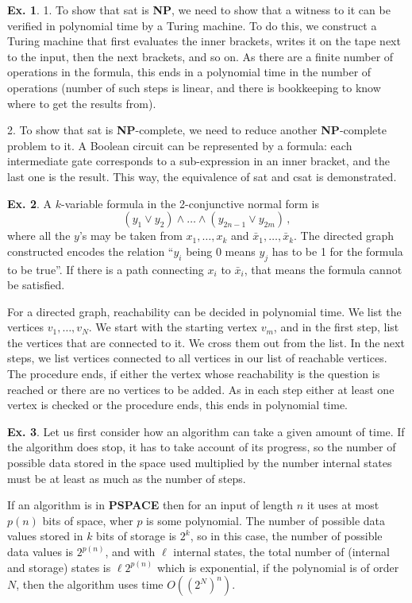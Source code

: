 \documentclass[a4paper,12pt]{article}
\theoremstyle{definition}
\newtheorem{exercise}{Ex.}[section]
\begin{document}
\begin{exercise}
 1. To show that {\sc sat} is {\bf NP}, we need to show that a witness to it can be verified in polynomial time by a Turing machine. To do this, we construct a Turing machine that first evaluates the inner brackets, writes it on the tape next to the input, then the next brackets, and so on. As there are a finite number of operations in the formula, this ends in a polynomial time in the number of operations (number of such steps is linear, and there is bookkeeping to know where to get the results from).
 
 2. To show that {\sc sat} is {\bf NP}-complete, we need to reduce another {\bf NP}-complete problem to it. A Boolean circuit can be represented by a formula: each intermediate gate corresponds to a sub-expression in an inner bracket, and the last one is the result. This way, the equivalence of {\sc sat} and {\sc csat} is demonstrated.
\end{exercise}

\begin{exercise}
 A $k$-variable formula in the 2-conjunctive normal form is
 \[
  (y_1 \lor y_2) \land \dots \land (y_{2n-1} \lor y_{2m})\,,
 \]
 where all the $y$'s may be taken from $x_1, \dots, x_k$ and $\bar{x}_1, \dots, \bar{x}_k$. The directed graph constructed encodes the relation ``$y_i$ being 0 means $y_j$ has to be 1 for the formula to be true''. If there is a path connecting $x_i$ to $\bar{x}_i$, that means the formula cannot be satisfied.
 
 For a directed graph, reachability can be decided in polynomial time. We list the vertices $v_1, \dots, v_N$. We start with the starting vertex $v_m$, and in the first step, list the vertices  that are connected to it. We cross them out from the list. In the next steps, we list vertices connected to all vertices in our list of reachable vertices. The procedure ends, if either the vertex whose reachability is the question is reached or there are no vertices to be added. As in each step either at least one vertex is checked or the procedure ends, this ends in polynomial time.
\end{exercise}

\begin{exercise}
 Let us first consider how an algorithm can take a given amount of time.  If the algorithm does stop, it has to take account of its progress, so the number of possible data stored in the space used multiplied by the number internal states must be at least as much as the number of steps.
 
 If an algorithm is in {\bf PSPACE} then for an input of length $n$ it uses at most $p(n)$ bits of space, wher $p$ is some polynomial. The number of possible data values stored in $k$ bits of storage is $2^k$, so in this case, the number of possible data values is $2^{p(n)}$, and with $\ell$ internal states, the total number of (internal and storage) states is $\ell 2^{p(n)}$ which is exponential, if the polynomial is of order $N$, then the algorithm uses time $O((2^N)^n)$.
\end{exercise}
\end{document}
